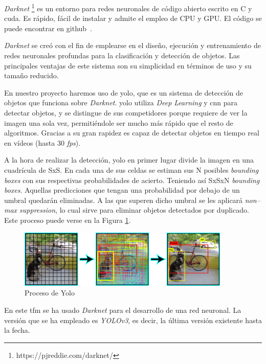 \textit{Darknet} \footnote{https://pjreddie.com/darknet/} es un entorno para redes neuronales de código abierto escrito en C y \acrshort{cuda}. Es rápido, fácil de instalar y admite el empleo de CPU y GPU. El código se puede encontrar en github~\cite{darknet_github}.

\textit{Darknet} se creó con el fin de emplearse en el diseño, ejecución y entrenamiento de redes neuronales profundas para la clasificación y detección de objetos. Las principales ventajas de este sistema son su simplicidad en términos de uso y su tama\~{n}o reducido.

En nuestro proyecto haremos uso de \acrfull{yolo}, que es un sistema de detección de objetos que funciona sobre \textit{Darknet}. \acrshort{yolo} utiliza \textit{Deep Learning} y \acrshort{cnn} para detectar objetos, y se distingue de sus competidores porque requiere de ver la imagen una sola vez, permitiéndole ser mucho más rápido que el resto de algoritmos. Gracias a su gran rapidez es capaz de detectar objetos en tiempo real en vídeos (hasta 30 \textit{\acrshort{fps}}).

A la hora de realizar la detección, \acrshort{yolo} en primer lugar divide la imagen en una cuadrícula de SxS. En cada una de sus celdas se estiman sus N posibles \textit{bounding boxes}  con sus respectivas probabilidades de acierto. Teniendo así SxSxN \textit{bounding boxes}. Aquellas predicciones que tengan una probabilidad por debajo de un umbral quedarán eliminadas. A las que superen dicho umbral se les aplicará \textit{non--max suppression}, lo cual sirve para eliminar objetos detectados por duplicado. Este proceso puede verse en la  Figura \ref{fig.yolo}.

\begin{figure}[H]
  \begin{center}
    \includegraphics[width=0.9\textwidth]{figures/Herramientas/yolo.png}
		\caption{Proceso de Yolo}
		\label{fig.yolo}
		\end{center}
\end{figure}

En este \acrshort{tfm} se ha usado \textit{Darknet} para el desarrollo de una red neuronal. La versión que se ha empleado es \textit{YOLOv3}, es decir, la última versión existente hasta la fecha.

